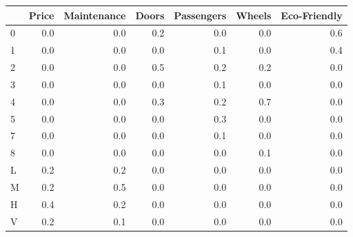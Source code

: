 \begin{tabular}{lrrrrrr}
\toprule
{} &  Price &  Maintenance &  Doors &  Passengers &  Wheels &  Eco-Friendly \\
\midrule
0 &    0.0 &          0.0 &    0.2 &         0.0 &     0.0 &           0.6 \\
1 &    0.0 &          0.0 &    0.0 &         0.1 &     0.0 &           0.4 \\
2 &    0.0 &          0.0 &    0.5 &         0.2 &     0.2 &           0.0 \\
3 &    0.0 &          0.0 &    0.0 &         0.1 &     0.0 &           0.0 \\
4 &    0.0 &          0.0 &    0.3 &         0.2 &     0.7 &           0.0 \\
5 &    0.0 &          0.0 &    0.0 &         0.3 &     0.0 &           0.0 \\
7 &    0.0 &          0.0 &    0.0 &         0.1 &     0.0 &           0.0 \\
8 &    0.0 &          0.0 &    0.0 &         0.0 &     0.1 &           0.0 \\
L &    0.2 &          0.2 &    0.0 &         0.0 &     0.0 &           0.0 \\
M &    0.2 &          0.5 &    0.0 &         0.0 &     0.0 &           0.0 \\
H &    0.4 &          0.2 &    0.0 &         0.0 &     0.0 &           0.0 \\
V &    0.2 &          0.1 &    0.0 &         0.0 &     0.0 &           0.0 \\
\bottomrule
\end{tabular}
